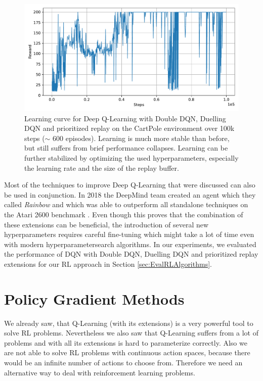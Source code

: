 \begin{figure}[t]
  
  \begin{center}
      \includegraphics[clip, width=0.8\columnwidth]{figures/rl/dqn_extensions_cart_pole_plot.pdf}
  \end{center}
  
  \caption[Learning Curve for DQN with Extensions on CartPole]{Learning curve for Deep Q-Learning with Double DQN, Duelling DQN and prioritized replay on the CartPole environment over 100k steps ($\sim$ 600 episodes). Learning is much more stable than before, but still suffers from brief performance collapses. Learning can be further stabilized by optimizing the used hyperparameters, especially the learning rate and the size of the replay buffer.}
  \label{fig:learning_curve_dqn}
\end{figure}



Most of the techniques to improve Deep Q-Learning that were discussed can also be used in conjunction. In 2018 the DeepMind team created an agent which they called \textit{Rainbow} and which was able to outperform all standalone techniques on the Atari 2600 benchmark \cite{bellemare2013arcade, hessel2018rainbow}. Even though this proves that the combination of these extensions can be beneficial, the introduction of several new hyperparameters requires careful fine-tuning which might take a lot of time even with modern hyperparametersearch algorithms. In our experiments, we evaluated the performance of DQN with Double DQN, Duelling DQN and prioritized replay extensions for our RL approach in Section \ref{sec:EvalRLAlgorithms}. 

\section{Policy Gradient Methods} \label{sec:PGMethods}
We already saw, that Q-Learning (with its extensions) is a very powerful tool to solve RL problems. Nevertheless we also saw that Q-Learning suffers from a lot of problems and with all its extensions is hard to parameterize correctly. Also we are not able to solve RL problems with continuous action spaces, because there would be an infinite number of actions to choose from. Therefore we need an alternative way to deal with reinforcement learning problems.


